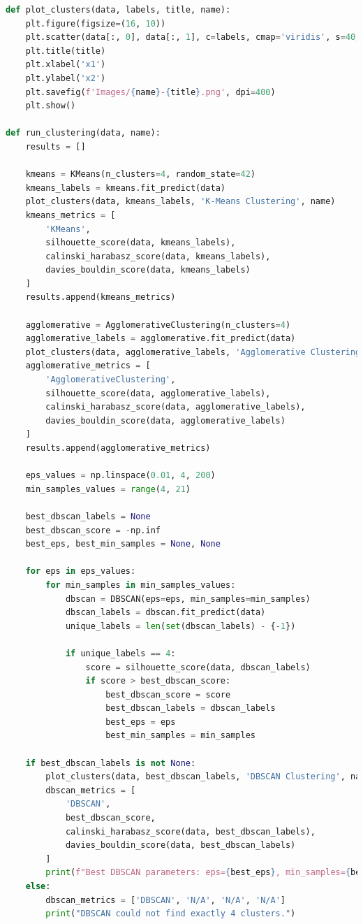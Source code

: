 \begin{lstlisting}[language=Python, caption=Code to Cluster Datasets and generate Metrics]
def plot_clusters(data, labels, title, name):
    plt.figure(figsize=(16, 10))
    plt.scatter(data[:, 0], data[:, 1], c=labels, cmap='viridis', s=40, edgecolors='black')
    plt.title(title)
    plt.xlabel('x1')
    plt.ylabel('x2')
    plt.savefig(f'Images/{name}-{title}.png', dpi=400)
    plt.show()

def run_clustering(data, name):
    results = []
    
    kmeans = KMeans(n_clusters=4, random_state=42)
    kmeans_labels = kmeans.fit_predict(data)
    plot_clusters(data, kmeans_labels, 'K-Means Clustering', name)
    kmeans_metrics = [
        'KMeans',
        silhouette_score(data, kmeans_labels),
        calinski_harabasz_score(data, kmeans_labels),
        davies_bouldin_score(data, kmeans_labels)
    ]
    results.append(kmeans_metrics)

    agglomerative = AgglomerativeClustering(n_clusters=4)
    agglomerative_labels = agglomerative.fit_predict(data)
    plot_clusters(data, agglomerative_labels, 'Agglomerative Clustering', name)
    agglomerative_metrics = [
        'AgglomerativeClustering',
        silhouette_score(data, agglomerative_labels),
        calinski_harabasz_score(data, agglomerative_labels),
        davies_bouldin_score(data, agglomerative_labels)
    ]
    results.append(agglomerative_metrics)

    eps_values = np.linspace(0.01, 4, 200)  
    min_samples_values = range(4, 21)

    best_dbscan_labels = None
    best_dbscan_score = -np.inf
    best_eps, best_min_samples = None, None

    for eps in eps_values:
        for min_samples in min_samples_values:
            dbscan = DBSCAN(eps=eps, min_samples=min_samples)
            dbscan_labels = dbscan.fit_predict(data)
            unique_labels = len(set(dbscan_labels) - {-1}) 

            if unique_labels == 4:
                score = silhouette_score(data, dbscan_labels)
                if score > best_dbscan_score:
                    best_dbscan_score = score
                    best_dbscan_labels = dbscan_labels
                    best_eps = eps
                    best_min_samples = min_samples

    if best_dbscan_labels is not None:
        plot_clusters(data, best_dbscan_labels, 'DBSCAN Clustering', name)
        dbscan_metrics = [
            'DBSCAN',
            best_dbscan_score,
            calinski_harabasz_score(data, best_dbscan_labels),
            davies_bouldin_score(data, best_dbscan_labels)
        ]
        print(f"Best DBSCAN parameters: eps={best_eps}, min_samples={best_min_samples}")
    else:
        dbscan_metrics = ['DBSCAN', 'N/A', 'N/A', 'N/A']
        print("DBSCAN could not find exactly 4 clusters.")
    

\end{lstlisting}
